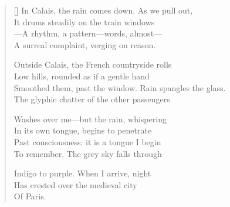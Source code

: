 \label{ch:across_france}
\settowidth{\versewidth}{Smoothed them, past the window.   Rain spangles the glass.}
\begin{verse}[\versewidth]
In Calais, the rain comes down. As we pull out,\\
It drums steadily on the train windows\\
---A rhythm, a pattern---words, almost---\\
A surreal complaint, verging on reason.

Outside Calais, the French countryside rolls\\
Low hills, rounded as if a gentle hand\\
Smoothed them, past the window.   Rain spangles the glass.\\
The glyphic chatter of the other passengers

Washes over me---but the rain, whispering\\
In its own tongue, begins to penetrate\\
Past consciousness: it is a tongue I begin\\
To remember.  The grey sky falls through

Indigo to purple. When I arrive, night\\
Has crested over the medieval city\\
                     Of Paris.
\end{verse}
